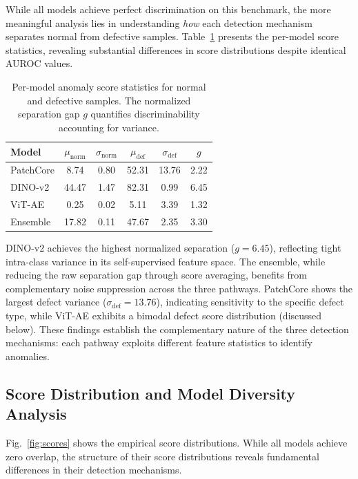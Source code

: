 \documentclass[journal]{IEEEtran}
\begin{document}
While all models achieve perfect discrimination on this benchmark, the more meaningful analysis lies in understanding \textit{how} each detection mechanism separates normal from defective samples. Table~\ref{tab:score_stats} presents the per-model score statistics, revealing substantial differences in score distributions despite identical AUROC values.

\begin{table}[t]
\centering
\caption{Per-model anomaly score statistics for normal and defective samples. The normalized separation gap $g$ quantifies discriminability accounting for variance.}
\label{tab:score_stats}
\begin{tabular}{lccccc}
\toprule
\textbf{Model} & $\mu_{\text{norm}}$ & $\sigma_{\text{norm}}$ & $\mu_{\text{def}}$ & $\sigma_{\text{def}}$ & $g$ \\
\midrule
PatchCore & 8.74 & 0.80 & 52.31 & 13.76 & 2.22 \\
DINO-v2 & 44.47 & 1.47 & 82.31 & 0.99 & 6.45 \\
ViT-AE & 0.25 & 0.02 & 5.11 & 3.39 & 1.32 \\
Ensemble & 17.82 & 0.11 & 47.67 & 2.35 & 3.30 \\
\bottomrule
\end{tabular}
\end{table}

DINO-v2 achieves the highest normalized separation ($g = 6.45$), reflecting tight intra-class variance in its self-supervised feature space. The ensemble, while reducing the raw separation gap through score averaging, benefits from complementary noise suppression across the three pathways. PatchCore shows the largest defect variance ($\sigma_{\text{def}} = 13.76$), indicating sensitivity to the specific defect type, while ViT-AE exhibits a bimodal defect score distribution (discussed below). These findings establish the complementary nature of the three detection mechanisms: each pathway exploits different feature statistics to identify anomalies.

\subsection{Score Distribution and Model Diversity Analysis}

Fig.~\ref{fig:scores} shows the empirical score distributions. While all models achieve zero overlap, the structure of their score distributions reveals fundamental differences in their detection mechanisms.
\end{document}

